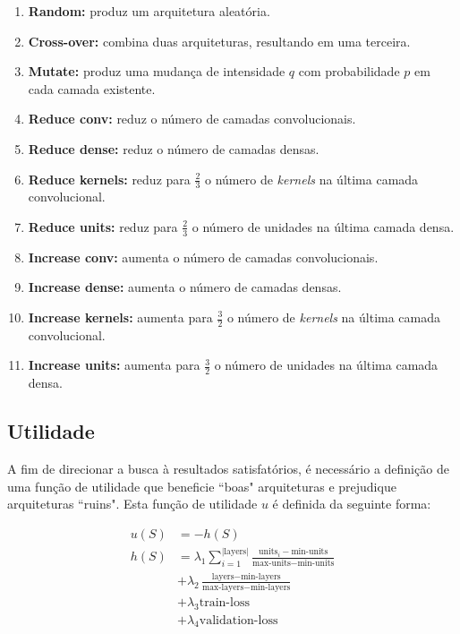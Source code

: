 \documentclass[twoside,conference,a4paper,12px]{IEEEtran}
\begin{document}
\begin{enumerate}
	\item \textbf{Random:} produz um arquitetura aleatória.
	\item \textbf{Cross-over:} combina duas arquiteturas, resultando em uma terceira.
	\item \textbf{Mutate:} produz uma mudança de intensidade $q$ com probabilidade $p$ em cada camada existente.
	\item \textbf{Reduce conv:} reduz o número de camadas convolucionais.
	\item \textbf{Reduce dense:} reduz o número de camadas densas.
	\item \textbf{Reduce kernels:} reduz para $\frac{2}{3}$ o número de \textit{kernels} na última camada convolucional.
	\item \textbf{Reduce units:} reduz para $\frac{2}{3}$ o número de unidades na última camada densa.
	\item \textbf{Increase conv:} aumenta o número de camadas convolucionais.
	\item \textbf{Increase dense:} aumenta o número de camadas densas.
	\item \textbf{Increase kernels:} aumenta para $\frac{3}{2}$ o número de \textit{kernels} na última camada convolucional.
	\item \textbf{Increase units:} aumenta para $\frac{3}{2}$ o número de unidades na última camada densa.
\end{enumerate}

\subsection{Utilidade}

A fim de direcionar a busca à resultados satisfatórios, é necessário a definição de uma função de utilidade que beneficie ``boas" arquiteturas e prejudique arquiteturas ``ruins". Esta função de utilidade $u$ é definida da seguinte forma:

\begin{align*}
	u(S) &= -h(S)\\
	h(S) &= \lambda_1 \sum_{i=1}^{|\text{layers}|} \frac{\text{units}_i - \text{min-units}}{\text{max-units} - \text{min-units}}\\
	&+ \lambda_2 \frac{\text{layers} - \text{min-layers}}{\text{max-layers} - \text{min-layers}}\\
	&+ \lambda_3 \text{train-loss}\\
	&+ \lambda_4 \text{validation-loss}
\end{align*}
\end{document}
